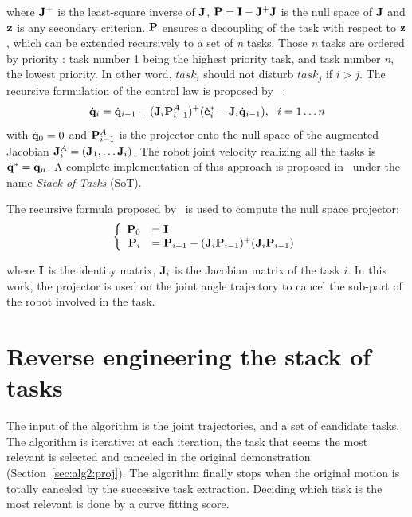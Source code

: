 \documentclass[letterpaper, 10pt, conference]{ieeeconf}      %
\begin{document}
\noindent where ${\mathbf{J}}^+$ is the least-square inverse of ${\mathbf{J}}$,
${\mathbf{P}} = {\mathbf{I}} - {\mathbf{J}}^+ {\mathbf{J}}$ is the null space
of ${\mathbf{J}}$ and ${\mathbf{z}}$ is any secondary criterion. ${\mathbf{P}}$ ensures
a decoupling of the task with respect to ${\mathbf{z}}$, which can be extended
recursively to a set of \emph{n} tasks. Those \emph{n} tasks
are ordered by priority : task number 1 being the highest priority task,
and task number \emph{n}, the lowest priority.
In other word, $task_i$ should not disturb $task_j$ if $i>j$.
The recursive formulation of the control law is proposed by~\cite{siciliano91} :
\begin{equation}
\dot{{\mathbf{q}}}_i = \dot{{\mathbf{q}}}_{i-1} + ({\mathbf{J}}_i {\mathbf{P}}_{i-1}^{A})^+
(\dot{{\mathbf{e}}}^*_i - {\mathbf{J}}_i \dot{{\mathbf{q}}}_{i-1}) , \ \ i = 1 \ldots n
\end{equation}
\noindent with $\dot{{\mathbf{q}}}_0 = 0$ and ${\mathbf{P}}_{i-1}^{A}$ is
the projector onto the null space of the augmented Jacobian
${\mathbf{J}}_i^A = ({\mathbf{J}}_1, \ldots {\mathbf{J}}_i)$. The robot
joint velocity realizing all the tasks is $\dot{{\mathbf{q}}}^* = \dot{{\mathbf{q}}}_n$.
A complete implementation of this approach is proposed in~\cite{mansard07} under the
name \emph{Stack of Tasks} (SoT). 

The recursive formula proposed by~\cite{baerlocher98} is used to compute
the null space projector:
\begin{equation}
  \left\{
      \begin{array}{rl}
        {\mathbf{P}}_0 &= {\mathbf{I}}\\
        {\mathbf{P}}_i &= {\mathbf{P}}_{i-1} - ({\mathbf{J}}_i {\mathbf{P}}_{i-1})^+({\mathbf{J}}_i {\mathbf{P}}_{i-1})\\
      \end{array}
    \right.
\end{equation}

\noindent where ${\mathbf{I}}$ is the identity matrix, ${\mathbf{J}}_i$ is the Jacobian matrix
of the task $i$. In this work, the projector is used on
the joint angle trajectory to cancel the sub-part of the robot involved in the task.

\section{Reverse engineering the stack of tasks} \label{sec:detect}

The input of the algorithm is the joint trajectories, and a set of candidate
tasks. The algorithm is iterative: at each iteration, the task that seems the
most relevant is selected and canceled in the original demonstration (Section~\ref{sec:alg2:proj}).
The algorithm finally stops when the original
motion is totally canceled by the successive task extraction. Deciding which
task is the most relevant is done by a curve fitting score. 
\end{document}
